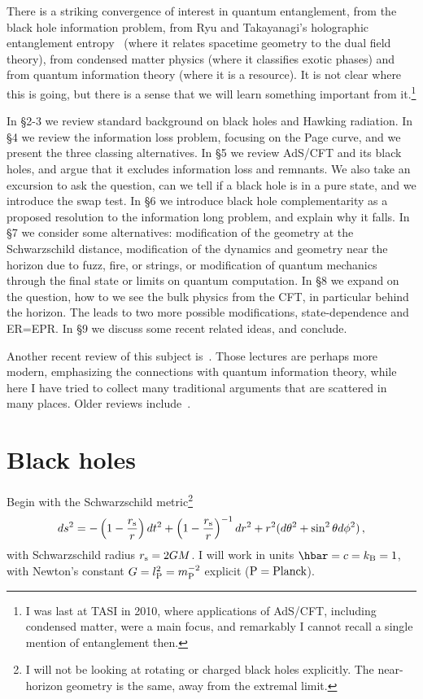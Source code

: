 \documentclass[12pt]{article}
\newcommand{\sect}[1]{\section{#1}\setcounter{equation}{0}}
\newcommand{\be}{\begin{equation}}
\newcommand{\ee}{\end{equation}}
\newcommand{\rmx}{\rm}
\begin{document}
There is a striking convergence of interest in quantum entanglement, from the black hole information problem, from Ryu and Takayanagi's holographic entanglement entropy~\cite{Ryu:2006bv} (where it relates spacetime geometry to the dual field theory), from condensed matter physics (where it classifies exotic phases) and from quantum information theory (where it is a resource).  It is not clear where this is going, but there is a sense that we will learn something important from it.\footnote{I was last at TASI in 2010, where applications of AdS/CFT, including condensed matter, were a main focus, and remarkably I cannot recall a single mention of entanglement then.}

In \S2-3 we review standard background on black holes and Hawking radiation.  In \S4 we review the information loss problem, focusing on the Page curve, and we present the three classing alternatives.  In \S5 we review AdS/CFT and its black holes, and argue that it excludes information loss and remnants.   We also  take an excursion to ask the question, can we tell if a black hole is in a pure state, and we introduce the swap test.
In \S6 we introduce black hole complementarity as a proposed resolution to the information long problem, and explain why it falls.  In \S7 we consider some alternatives: modification of the geometry at the Schwarzschild distance, modification of the dynamics and geometry near the horizon due to fuzz, fire, or strings, or modification of quantum mechanics through the final state or limits on quantum computation.  In \S8 we expand on the question, how to we see the bulk physics from the CFT, in particular behind the horizon.  The leads to two more possible modifications, state-dependence and ER=EPR.
In \S9 we discuss some recent related ideas, and conclude.

Another recent review of this subject is~\cite{Harlow:2014yka}.  Those lectures are perhaps more modern, emphasizing the connections with quantum information theory, while here I have tried to collect many traditional arguments that are scattered in many places.  Older reviews include~\cite{Page:1993up,Mathur:2009hf}.

\sect{Black holes}

Begin with the Schwarzschild metric\footnote{I will not be looking at rotating or charged black holes explicitly.  The near-horizon geometry is the same, away from the extremal limit.}
\be
ds^2 = - \left( 1 - \frac{r_{\rmx s} }{r} \right) dt^2 +  \left( 1 - \frac{r_{\rmx s} }{r} \right)^{-1} dr^2 + r^2 (d\theta^2 + \sin^2\theta d\phi^2)\,,  \label{schw}
\ee
with Schwarzschild radius $r_{\rmx s}  = 2GM$.  I will work in units $\hbar = c = k_{\rmx B}= 1$, with Newton's constant $G = l^2_{\rm P}= m^{-2}_{\rm P}$ explicit (${\rm P} =  {\rm Planck}$). 
\end{document}
